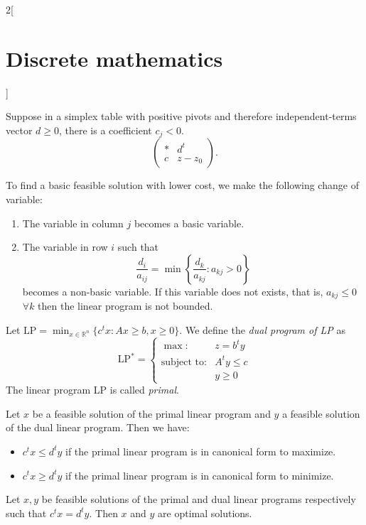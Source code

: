 \documentclass[../../../main.tex]{subfiles}
\begin{document}
\begin{multicols}{2}[\section{Discrete mathematics}]
\begin{definition}
\end{definition}
\begin{prop}
Suppose in a simplex table with positive pivots and therefore independent-terms vector $d\geq 0$, there is a coefficient $c_j<0$. $$\left(\begin{array}{c|c}
    * & d^t\\
    \hline
    c & z-z_0
\end{array}\right).$$
\end{prop}
To find a basic feasible solution with lower cost, we make the following change of variable:
\begin{enumerate}
    \item The variable in column $j$ becomes a basic variable.
    \item The variable in row $i$ such that $$\frac{d_i}{a_{ij}}=\min\left\{\frac{d_k}{a_{kj}}:a_{kj}>0\right\}$$ becomes a non-basic variable. If this variable does not exists, that is, $a_{kj}\leq0$ $\forall k$ then the linear program is not bounded.
\end{enumerate}
\begin{definition}
Let $\text{LP}=\displaystyle\min_{x\in\mathbb{R}^n}\{c^tx:Ax\geq b,x\geq 0\}$. We define the \textit{dual program of LP} as $$\text{LP}^*=\left\{\begin{array}{rc}
    \max: & z=b^ty \\
    \text{subject to}: & A^ty\leq c\\
     & y\geq 0
    \end{array}\right.$$ The linear program LP is called \textit{primal}.
\end{definition}
\begin{theorem}
Let $x$ be a feasible solution of the primal linear program and $y$ a feasible solution of the dual linear program. Then we have:
\begin{itemize}
    \item $c^tx\leq d^ty$ if the primal linear program is in canonical form to maximize.
    \item $c^tx\geq d^ty$ if the primal linear program is in canonical form to minimize.
\end{itemize}
\end{theorem}
\begin{corollary}
Let $x,y$ be feasible solutions of the primal and dual linear programs respectively such that $c^tx=d^ty$. Then $x$ and $y$ are optimal solutions.
\end{corollary}

\end{multicols}
\end{document}
